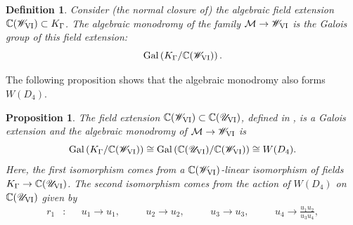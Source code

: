 \documentclass[a4paper,reqno]{amsart}
\numberwithin{equation}{section}
\newcommand{\C}{\mathbb{C}}
\newtheorem{definition}[theorem]{Definition}
\newtheorem{proposition}[theorem]{Proposition}
\numberwithin{equation}{section}
\begin{document}
 \begin{definition}
 Consider (the normal closure of) the algebraic field extension $\C(\mathscr{W}_{\rm{VI}}) \subset K_{\Gamma}$.
   The \emph{algebraic monodromy} of the family $\mathcal{M}\to \mathscr{W}_{\rm{VI}}$ is the Galois group of this field extension:
    \begin{equation*}
        \operatorname{Gal}\left( K_{\Gamma}/\C (\mathscr{W}_{\rm{VI}})\right).
    \end{equation*}
\end{definition}

The following proposition shows that the algebraic monodromy also forms $W(D_4)$.
\begin{proposition}\label{prop:algebraicmonodromyPVI} 
    The field extension $\C(\mathscr{W}_{\rm{VI}})\subset \C(\mathscr{U}_{\rm{VI}})$, defined in , is a Galois extension and the algebraic monodromy of $\mathcal{M}\to\mathscr{W}_{\rm{VI}}$ is 
    \begin{equation*}
\operatorname{Gal}\left( K_{\Gamma}/\C (\mathscr{W}_{\rm{VI}})\right)\cong \operatorname{Gal}\left(\C(\mathscr{U}_{\rm{VI}})/\C(\mathscr{W}_{\rm{VI}})\right)\cong W(D_4).
    \end{equation*}
    Here, the first isomorphism comes from a $\C(\mathscr{W}_{\rm{VI}})$-linear isomorphism of fields 
    $K_{\Gamma} \to \C(\mathscr{U}_{\rm{VI}})$. 
    The second isomorphism comes from the action of $W(D_4)$ on $\C(\mathscr{U}_{\rm{VI}})$ given by 
    \begin{equation} \label{pvi:actionofD4onU}
\begin{aligned}
    r_1 &: &&u_1\to u_1, \quad 
    &&u_2\to u_2, \quad 
    &&u_3\to u_3, \quad 
    &&u_4 \to \frac{u_1 u_2}{u_3 u_4}, \\

\end{aligned}
\end{equation}
\end{proposition}
\end{document}
